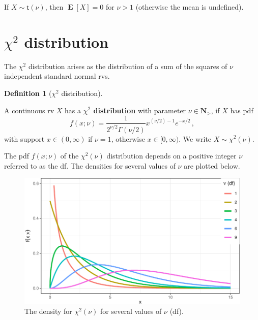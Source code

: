 \documentclass[
  a4paper,
  oneside]{book}
\DeclareMathOperator{\E}{\mathbf{E}}%
\theoremstyle{definition}
\newtheorem{definition}{Definition}[chapter]
\theoremstyle{definition}
\theoremstyle{definition}
\theoremstyle{plain}
\theoremstyle{remark}
\begin{document}
If \(X \sim \mathsf{t}(\nu)\), then \(\E[X] = 0\) for \(\nu > 1\)
(otherwise the mean is undefined).

\section{\texorpdfstring{\(\chi^2\)
distribution}{\textbackslash chi\^{}2 distribution}}\label{chisq-distribution}

The \(\chi^2\) distribution arises as the distribution of a sum of the
squares of \(\nu\) independent standard normal rvs.

\begin{definition}[\(\chi^2\)
distribution]\protect\hypertarget{def-chisq-dist}{}\label{def-chisq-dist}

A continuous rv \(X\) has a \textbf{\(\chi^2\) distribution} with
parameter \(\nu \in \mathbf{N}_{>}\), if \(X\) has pdf \begin{equation*}
f(x; \nu) = \frac{1}{2^{\nu/2} \Gamma(\nu/2)} x^{(\nu/2)-1} e^{-x/2} \,, 
\end{equation*} with support \(x \in (0, \infty)\) if \(\nu=1\),
otherwise \(x \in [0, \infty)\). We write \(X \sim \chi^2(\nu)\).

\end{definition}

The pdf \(f(x; \nu)\) of the \(\chi^2(\nu)\) distribution depends on a
positive integer \(\nu\) referred to as the df. The densities for
several values of \(\nu\) are plotted below.

\begin{figure}[H]

{\centering \includegraphics{01-sampling-distributions_files/figure-pdf/exemplar-chisq-dist-1.pdf}

}

\caption{The density for \(\chi^2(\nu)\) for several values of \(\nu\)
(df).}

\end{figure}%
\end{document}
